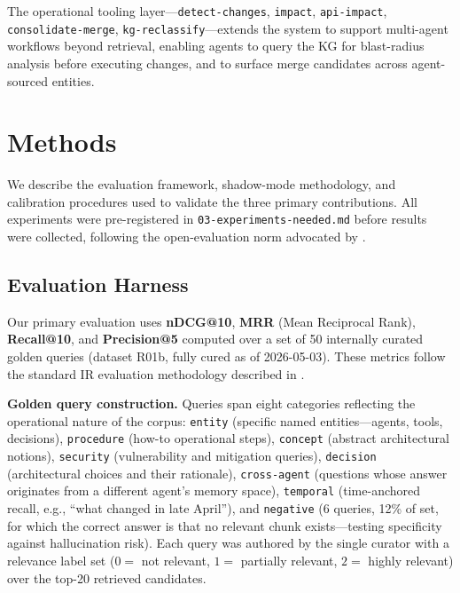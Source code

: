 \documentclass{article}
\begin{document}
The operational tooling layer---\texttt{detect-changes}, \texttt{impact},
\texttt{api-impact}, \texttt{consolidate-merge}, \texttt{kg-reclassify}---extends the
system to support multi-agent workflows beyond retrieval, enabling agents to query the KG
for blast-radius analysis before executing changes, and to surface merge candidates across
agent-sourced entities.

\fi %






\iffalse
\section{Methods}

We describe the evaluation framework, shadow-mode methodology, and calibration procedures
used to validate the three primary contributions. All experiments were pre-registered in
\texttt{03-experiments-needed.md} before results were collected, following the
open-evaluation norm advocated by \cite{rogers2021just}.

\subsection{Evaluation Harness}

Our primary evaluation uses \textbf{nDCG@10}, \textbf{MRR} (Mean Reciprocal Rank),
\textbf{Recall@10}, and \textbf{Precision@5} computed over a set of 50 internally curated
golden queries (dataset R01b, fully cured as of 2026-05-03). These metrics follow the
standard IR evaluation methodology described in \cite{manning2008introduction}.

\textbf{Golden query construction.} Queries span eight categories reflecting the
operational nature of the corpus: \texttt{entity} (specific named entities---agents, tools,
decisions), \texttt{procedure} (how-to operational steps), \texttt{concept} (abstract
architectural notions), \texttt{security} (vulnerability and mitigation queries),
\texttt{decision} (architectural choices and their rationale), \texttt{cross-agent}
(questions whose answer originates from a different agent's memory space),
\texttt{temporal} (time-anchored recall, e.g., ``what changed in late April''), and
\texttt{negative} (6 queries, 12\% of set, for which the correct answer is that no
relevant chunk exists---testing specificity against hallucination risk). Each query was
authored by the single curator with a relevance label set ($0 =$ not relevant,
$1 =$ partially relevant, $2 =$ highly relevant) over the top-20 retrieved candidates.
\end{document}
